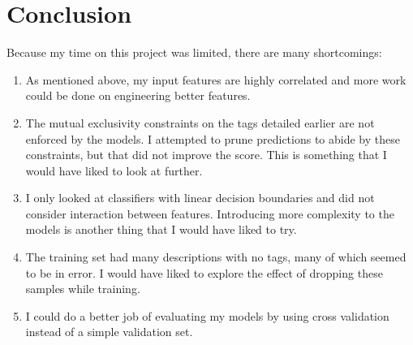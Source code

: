 \documentclass{article}
\begin{document}
\section{Conclusion}
Because my time on this project was limited, there are many shortcomings:

\begin{enumerate}
	\item As mentioned above, my input features are highly correlated and more work could be done on engineering better features.
	\item The mutual exclusivity constraints on the tags detailed earlier are not enforced by the models. I attempted to prune predictions to abide by these constraints, but that did not improve the score. This is something that I would have liked to look at further.
	\item I only looked at classifiers with linear decision boundaries and did not consider interaction between features. Introducing more complexity to the models is another thing that I would have liked to try.
	\item The training set had many descriptions with no tags, many of which seemed to be in error. I would have liked to explore the effect of dropping these samples while training.
	\item I could do a better job of evaluating my models by using cross validation instead of a simple validation set.
\end{enumerate}
\end{document}
